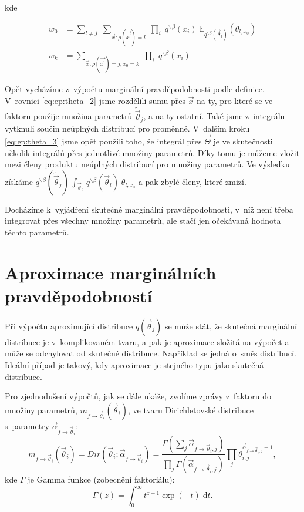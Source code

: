 kde

\begin{align}
w_0 &=
	\sum_{l \ne j} \;
		\sum_{\vec{x}: \rho(\vec{x^\prime}) = l} \;
			\prod_i \;
 				q^{\backslash \beta}(x_i) \;
				\mathbb{E}_{q^{\backslash \beta}(\vec{\theta}_l)} (
					\theta_{l,
					x_0}) 
\\
w_k &=
	\sum_{\vec{x}: \rho(\vec{x^\prime}) = j, x_0 = k} \; 
		\prod_i \;
			q^{\backslash \beta}(x_i)		
\end{align}

Opět vycházíme z~výpočtu marginální pravděpodobnosti podle definice.
V~rovnici \eqref{eq:ep:theta_2} jsme rozdělili sumu přes
$\vec{x}$ na ty, pro které se ve faktoru použije množina parametrů
$\tilde{\vec{\theta}}_j$, a na ty ostatní. Také jsme z~integrálu vytknuli součin
neúplných distribucí pro proměnné. V~dalším kroku \eqref{eq:ep:theta_3} jsme opět
použili toho, že integrál přes $\vec{\Theta}$ je ve skutečnosti několik
integrálů přes jednotlivé množiny parametrů. Díky tomu je můžeme vložit mezi členy produktu neúplných distribucí pro množiny parametrů. Ve výsledku
získáme $q^{\backslash \beta}(\tilde{\vec{\theta}}_j) \, \int_{\vec{\theta}_l} \,
q^{\backslash \beta}(\vec{\theta}_l) \; \theta_{l, x_0}$ a pak zbylé členy, které zmizí.

Docházíme k~vyjádření skutečné marginální pravděpodobnosti, v~níž není třeba
integrovat přes všechny množiny parametrů, ale stačí jen očekávaná hodnota
těchto parametrů.

\section{Aproximace marginálních pravděpodobností}

Při výpočtu aproximující distribuce $q(\vec{\theta}_j)$ se může stát, že skutečná marginální distribuce je v~komplikovaném tvaru, a pak je aproximace složitá na výpočet a může se odchylovat od skutečné distribuce.
Například se jedná o~směs distribucí.
Ideální případ je takový, kdy aproximace je stejného typu jako skutečná distribuce.

Pro zjednodušení výpočtů, jak se dále ukáže, zvolíme zprávy z~faktoru do množiny parametrů, $m_{f \rightarrow \vec{\theta}_i}(\vec{\theta}_i)$, ve tvaru Dirichletovské distribuce s~parametry $\vec\alpha_{f \rightarrow \vec\theta_i}$:
\begin{equation}
m_{f \rightarrow \vec{\theta}_i}(\vec{\theta}_i) =
	Dir(\vec{\theta}_i; \vec\alpha_{f \rightarrow \vec\theta_i}) =
        \frac{\Gamma (\sum_j \vec\alpha_{f \rightarrow \vec\theta_i, j})}
             {\prod_j \Gamma(\vec\alpha_{f \rightarrow \vec\theta_i, j})}
        \prod_j \theta_{i,j}^{\vec\alpha_{f \rightarrow \vec\theta_i, j} - 1},
\end{equation}
kde $\Gamma$ je Gamma funkce (zobecnění faktoriálu):
\begin{equation}
    \Gamma(z) = \int_0^\infty \! t^{z-1} \exp(-t) \;\mathrm{d}t.
\end{equation}


